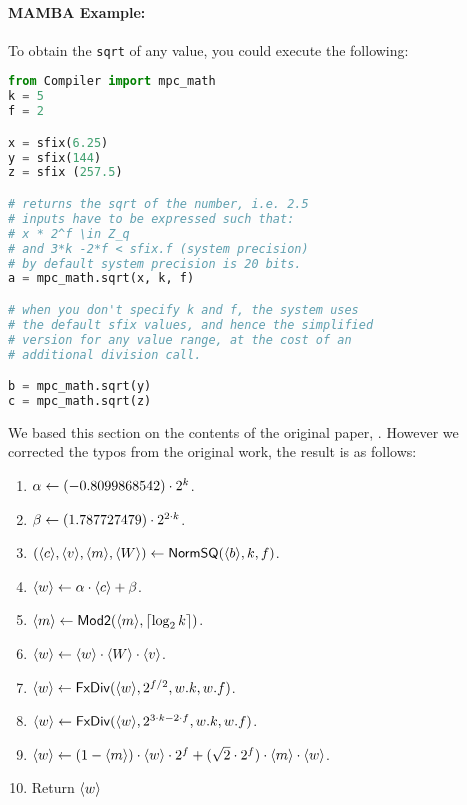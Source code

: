 \paragraph{MAMBA Example:} To obtain the \verb|sqrt| of any value, you could execute the following:
\begin{lstlisting}[language={python}]
from Compiler import mpc_math
k = 5
f = 2

x = sfix(6.25)
y = sfix(144)
z = sfix (257.5)

# returns the sqrt of the number, i.e. 2.5
# inputs have to be expressed such that:
# x * 2^f \in Z_q
# and 3*k -2*f < sfix.f (system precision)
# by default system precision is 20 bits.
a = mpc_math.sqrt(x, k, f)

# when you don't specify k and f, the system uses
# the default sfix values, and hence the simplified
# version for any value range, at the cost of an
# additional division call.

b = mpc_math.sqrt(y)
c = mpc_math.sqrt(z)

\end{lstlisting}

We based this section on the contents of the original paper, \cite{Liedel12}.
However we corrected the typos from the original work, the result is as follows:
\begin{enumerate}
  \item $\alpha \leftarrow (-0.8099868542) \cdot 2^k$.
  \item $\beta \leftarrow (1.787727479) \cdot 2^{2\cdot k}$.
  \item $(\langle c \rangle,\langle v \rangle,\langle m \rangle,\langle W \rangle) \leftarrow \mathsf{NormSQ}(\langle b \rangle,k,f)$.
  \item $\langle w \rangle \leftarrow \alpha \cdot \langle c \rangle+\beta$.
  \item $\langle m \rangle \leftarrow \mathsf{Mod2}(\langle m \rangle,{\lceil \log_2 k \rceil})$.
  \item $\langle w \rangle \leftarrow \langle w \rangle \cdot \langle W \rangle \cdot \langle v \rangle$.
  \item $\langle w \rangle \leftarrow \mathsf{FxDiv}(\langle w \rangle,2^{f/2},w.k,w.f)$.
  \item $\langle w \rangle \leftarrow \mathsf{FxDiv}(\langle w \rangle,2^{3 \cdot k - 2 \cdot f},w.k,w.f)$.
  \item $\langle w \rangle \leftarrow (1-\langle m \rangle) \cdot \langle w \rangle \cdot 2^f
          +(\sqrt{2} \cdot 2^f) \cdot \langle m \rangle\cdot \langle w \rangle$.
  \item Return $\langle w \rangle$ %
\end{enumerate}


